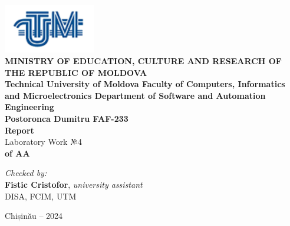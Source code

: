\documentclass[12pt]{article}
\begin{document}
\begin{titlepage}
\begin{center}
    \includegraphics[width=0.3\textwidth]{image.png} \\[0.2cm]
    
    \textbf{MINISTRY OF EDUCATION, CULTURE AND RESEARCH 
OF THE REPUBLIC OF MOLDOVA} \\[0.3cm]
    
    \textbf{Technical University of Moldova 
Faculty of Computers, Informatics and Microelectronics 
Department of Software and Automation Engineering} \\[2cm]
    
    \textbf{Postoronca Dumitru FAF-233}\\[0.5cm]
    
    \Huge \textbf{Report} \\[0.5cm]
    
    \large Laboratory Work №4\\[0.5cm]
    
    \textbf{of AA} \\[3cm]
    
    \begin{flushright}
        \textit{Checked by:} \\
        \textbf{Fistic Cristofor}, \textit{university assistant} \\
        DISA, FCIM, UTM
    \end{flushright}
    
    \vfill
    
    Chișinău -- 2024
\end{center}
\end{titlepage}

\newpage
\setcounter{page}{1}
\pagestyle{fancy}
\fancyhf{}
\rhead{\thepage}
\end{document}
